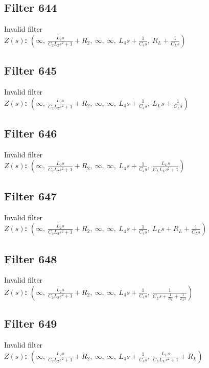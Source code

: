 \documentclass{article}
\begin{document}
\subsection*{Filter 644}
Invalid filter \\ 
\textbf{$Z(s)$:} $\left( \infty, \  \frac{L_{2} s}{C_{2} L_{2} s^{2} + 1} + R_{2}, \  \infty, \  \infty, \  L_{4} s + \frac{1}{C_{4} s}, \  R_{L} + \frac{1}{C_{L} s}\right)$ \\ 
\subsection*{Filter 645}
Invalid filter \\ 
\textbf{$Z(s)$:} $\left( \infty, \  \frac{L_{2} s}{C_{2} L_{2} s^{2} + 1} + R_{2}, \  \infty, \  \infty, \  L_{4} s + \frac{1}{C_{4} s}, \  L_{L} s + \frac{1}{C_{L} s}\right)$ \\ 
\subsection*{Filter 646}
Invalid filter \\ 
\textbf{$Z(s)$:} $\left( \infty, \  \frac{L_{2} s}{C_{2} L_{2} s^{2} + 1} + R_{2}, \  \infty, \  \infty, \  L_{4} s + \frac{1}{C_{4} s}, \  \frac{L_{L} s}{C_{L} L_{L} s^{2} + 1}\right)$ \\ 
\subsection*{Filter 647}
Invalid filter \\ 
\textbf{$Z(s)$:} $\left( \infty, \  \frac{L_{2} s}{C_{2} L_{2} s^{2} + 1} + R_{2}, \  \infty, \  \infty, \  L_{4} s + \frac{1}{C_{4} s}, \  L_{L} s + R_{L} + \frac{1}{C_{L} s}\right)$ \\ 
\subsection*{Filter 648}
Invalid filter \\ 
\textbf{$Z(s)$:} $\left( \infty, \  \frac{L_{2} s}{C_{2} L_{2} s^{2} + 1} + R_{2}, \  \infty, \  \infty, \  L_{4} s + \frac{1}{C_{4} s}, \  \frac{1}{C_{L} s + \frac{1}{R_{L}} + \frac{1}{L_{L} s}}\right)$ \\ 
\subsection*{Filter 649}
Invalid filter \\ 
\textbf{$Z(s)$:} $\left( \infty, \  \frac{L_{2} s}{C_{2} L_{2} s^{2} + 1} + R_{2}, \  \infty, \  \infty, \  L_{4} s + \frac{1}{C_{4} s}, \  \frac{L_{L} s}{C_{L} L_{L} s^{2} + 1} + R_{L}\right)$ \\ 
\end{document}
